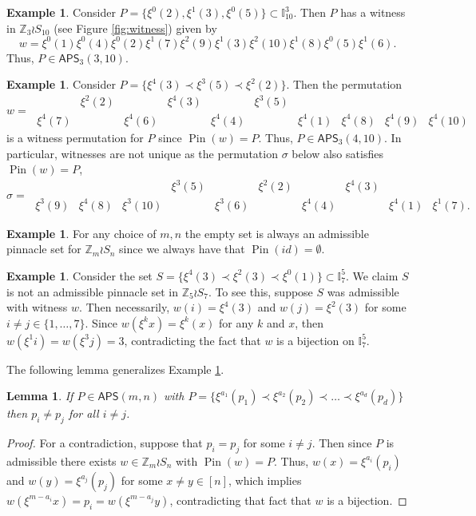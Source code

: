 \documentclass[12pt,reqno]{amsart}
\numberwithin{equation}{section}
\theoremstyle{plain}
\newtheorem{lemma}[theorem]{Lemma}
\theoremstyle{definition}
\newtheorem{example}[theorem]{Example}
\theoremstyle{remark}
\newcommand{\Z}{\mathbb{Z}}
\newcommand{\I}{\mathbb{I}}
\newcommand{\Pin}{\operatorname{Pin}}
\newcommand\APS{\mathsf{APS}}
\begin{document}
\begin{example}\label{ex:noncanonical witness}
    Consider $P =\{\xi^0(2),\xi^1(3),\xi^0(5)\} \subset \I_{10}^3$. Then $P$ has a witness in $\Z_3 \wr S_{10}$ (see Figure \ref{fig:witness}) given by
\[w =\xi^0(1)\xi^0(4)\xi^0(2)\xi^1(7)\xi^2(9)\xi^1(3)\xi^2(10)\xi^1(8)\xi^0(5)\xi^1(6).\]
Thus, $P \in \APS_3(3,10)$.
\end{example}

\begin{example}\label{ex:witness}
Consider $P = \{\xi^4(3)\prec \xi^3(5)\prec \xi^2(2)\}$. Then the permutation 
\[w=\;\begin{matrix}
   &\xi^2(2)&&\xi^4(3)&&\xi^3(5)&
\\
\xi^4(7)&&\xi^4(6)&&\xi^4(4)&&\xi^4(1)& \xi^4(8)& \xi^4(9)& \xi^4(10)
\end{matrix}\]
is a witness permutation for $P$ since $\Pin(w)=P$. Thus, $P \in \APS_3(4,10)$.
In particular, witnesses are not unique as the permutation $\sigma$ below also satisfies $\Pin(w)=P$, 
\[\sigma=\;\begin{matrix}
    &&&\xi^3(5)&&\xi^2(2)&& \xi^4(3) \\ 
    \xi^3(9) & \xi^4(8) & \xi^3(10)&&\xi^3(6)&&\xi^4(4)&&\xi^4(1)& \xi^1(7).
\end{matrix}
\]
\end{example}

\begin{example}\label{ex:trivial}
For any choice of $m,n$ the empty set is always an admissible pinnacle set for $\Z_m\wr S_n$ since we always have that $\Pin(id)=\emptyset$. 
\end{example}

\begin{example}\label{ex:inadmissible}
    Consider the set $S = \{\xi^4(3) \prec \xi^2(3) \prec \xi^0(1)\} \subset \I_7^5$. We claim $S$ is not an admissible pinnacle set in $\Z_5 \wr S_7$. To see this, suppose $S$ was admissible with witness $w$. Then necessarily, $w(i) = \xi^4(3)$ and $w(j) = \xi^2(3)$ for some $i\neq j \in \{ 1, \dots, 7\}$. Since $w(\xi^k x) = \xi^k(x)$ for any $k$ and $x$, then $w(\xi^1 i) = w(\xi^3 j) = 3$, contradicting the fact that $w$ is a bijection on $\I_7^5$.
\end{example}

The following lemma generalizes Example \ref{ex:inadmissible}.

\begin{lemma} \label{lem: multiplicity} 
    If $P \in \APS(m, n)$ with $P = \{ \xi^{a_1}(p_1) \prec \xi^{a_2}(p_2) \prec \dots \prec \xi^{a_d}(p_d)\}$ then $p_i \neq p_j$ for all $i \neq j$.
\end{lemma}
\begin{proof}
For a contradiction, suppose that $p_i = p_j$ for some $i\neq j$. Then since $P$ is admissible there exists $w \in \Z_m \wr S_n$ with $\Pin(w) = P$. Thus, $w(x) =\xi^{a_i}(p_i)$ and $w(y) =\xi^{a_j}(p_j)$ for some $x\neq y \in [n]$, which implies $w(\xi^{m-a_i}x)=p_i=w(\xi^{m-a_j}y)$, contradicting that fact that $w$ is a bijection.
\end{proof}
\end{document}

